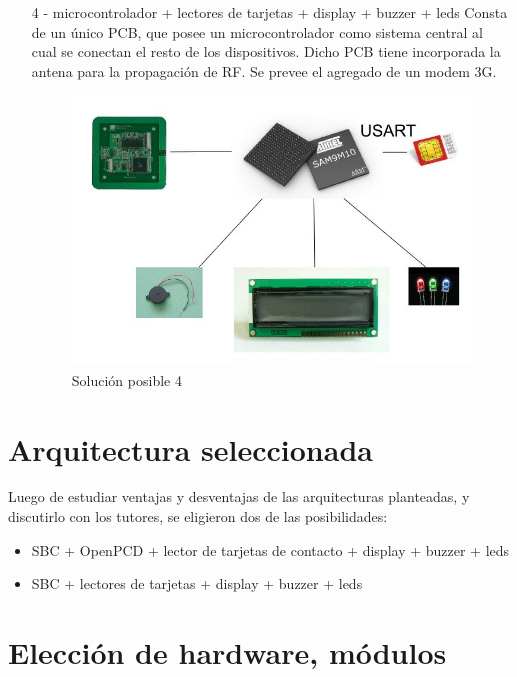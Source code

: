 \begin{itemize}
\item[4 -] microcontrolador + lectores de tarjetas + display + buzzer + leds
Consta de un único PCB, que posee un microcontrolador como sistema central al cual se
conectan el resto de los dispositivos. Dicho PCB tiene incorporada la antena para la
propagación de RF. Se prevee el agregado de un modem 3G.

\begin{figure}[H]
\centering
  \begin{center}
  \includegraphics[scale=.25]{Imagenes/4.jpg} 
  \end{center}
  \caption{Solución posible 4}\label{Fig:HW} 
\end{figure}

\end{itemize}

\newpage
\section{Arquitectura seleccionada}
Luego de estudiar ventajas y desventajas de las arquitecturas planteadas, y discutirlo con los tutores, se eligieron dos de las posibilidades:

\begin{itemize}
\item SBC + OpenPCD + lector de tarjetas de contacto + display + buzzer + leds
\item SBC + lectores de tarjetas + display + buzzer + leds
\end{itemize}


\section{Elecci\'on de hardware, m\'odulos}

